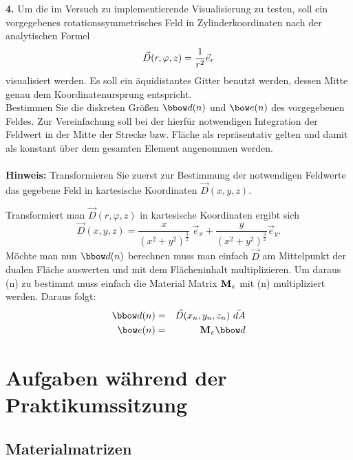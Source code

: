 \documentclass[Protokollheft.tex]{subfiles}
\begin{document}
\begin{framed}
	\noindent \textbf{4.} Um die im Versuch zu implementierende Visualisierung zu testen, soll ein vorgegebenes
    rotationssymmetrisches Feld in Zylinderkoordinaten nach der analytischen Formel
    \begin{align}
     \vec{D}(r,\varphi,z)=\frac{1}{r^2}  \vec{e}_r
    \end{align}
    visualisiert werden. Es soll ein äquidistantes Gitter benutzt werden, dessen Mitte genau dem Koordinatenursprung entspricht.\\
Bestimmen Sie die diskreten Größen $\dfitloc(n)$ und $\efitloc(n)$ des vorgegebenen Feldes. Zur Vereinfachung soll bei der hierfür notwendigen Integration der Feldwert in der Mitte der Strecke bzw. Fläche als repräsentativ gelten und damit als konstant über dem gesamten Element angenommen werden. \\
    \ \\
    {\textbf{Hinweis:}} Transformieren Sie zuerst zur Bestimmung der notwendigen Feldwerte das gegebene Feld in kartesische Koordinaten $\vec{D}(x,y,z)$.\label{exer:visualizeFieldPrep}
%
\end{framed}
\noindent
Transformiert man $\vec{D}(r,\varphi,z)$ in kartesische Koordinaten ergibt sich
\begin{equation*}
	\vec{D}(x,y,z)=\frac{x}{(x^2+y^2)^{\frac{3}{2}}} \ \vec{e}_x+\frac{y}{(x^2+y^2)^{\frac{3}{2}}} \vec{e}_y.
\end{equation*}
Möchte man nun $\dfitloc(n)$ berechnen muss man einfach $\vec{D}$ am Mittelpunkt der dualen Fläche auswerten und mit dem Flächeninhalt multiplizieren. Um daraus \efitloc(n) zu bestimmt muss einfach die Material Matrix $\mathbf{M}_{\upvarepsilon}$ mit \dfitloc(n) multipliziert werden. Daraus folgt:
\begin{eqnarray*}
\dfitloc(n)&=&\vec{D}(x_n,y_n,z_n)\ \tilde{dA}\\
\efitloc(n)&=&\Meps\dfitloc
\end{eqnarray*}



\section{Aufgaben während der Praktikumssitzung}

\subsection{Materialmatrizen}
\end{document}
